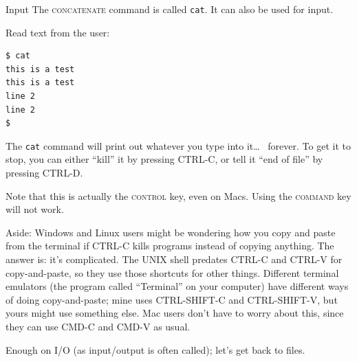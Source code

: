 \begin{frame}[fragile]{Input}
  \pause
  \alert<3>{The \textsc{concatenate} command is called \texttt{cat}}. It can
  also be used for input.
  \pause
  \begin{example}[cat]
    Read text from the user:
    \begin{verbatim}
$ cat
this is a test
this is a test
line 2
line 2
$ 
    \end{verbatim}
  \end{example}

  The \texttt{cat} command will print out whatever you type into it\ldots~
  forever.  To get it to stop, you can either \enquote{kill} it by pressing
  \textsc{CTRL-C}, or tell it \enquote{end of file} by pressing
  \textsc{CTRL-D}.
   {
    Note that this is actually the \textsc{control} key, even on Macs.  Using
    the \textsc{command} key will not work.

    Aside: Windows and Linux users might be wondering how you copy and paste from the
    terminal if \textsc{CTRL-C} kills programs instead of copying anything. The
    answer is: it's complicated. The UNIX shell predates \textsc{CTRL-C} and
    \textsc{CTRL-V} for copy-and-paste, so they use those shortcuts for other
    things.  Different terminal emulators (the program called
    \enquote{Terminal} on your computer) have different ways of doing
    copy-and-paste; mine uses \textsc{CTRL-SHIFT-C} and \textsc{CTRL-SHIFT-V},
    but yours might use something else.  Mac users don't have to worry about
    this, since they can use \textsc{CMD-C} and \textsc{CMD-V} as usual.
  }
\end{frame}

Enough on I/O (as input/output is often called); let's get back to files.

